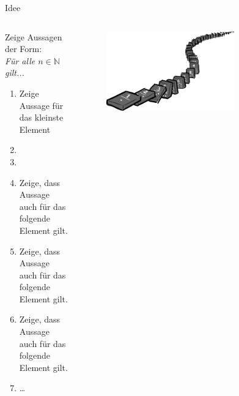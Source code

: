 \begin{frame}[fragile]{Idee}
\begin{columns}
    \begin{alertblock}{Zeige Aussagen der Form:\\\emph{Für alle $n\in\mathbb{N}$ gilt...}}
    \begin{enumerate}
        \item Zeige Aussage für das kleinste Element
        \item<1-> 
        \item<2-6,8> 
        \item<3-6> \footnotesize Zeige, dass Aussage auch für das folgende Element gilt.
        \item<4-6> \scriptsize Zeige, dass Aussage auch für das folgende Element gilt.
        \item<5-6> \tiny Zeige, dass Aussage auch für das folgende Element gilt.
        \item<6> \dots
    \end{enumerate}
    \end{alertblock}
    \begin{figure}
        \centering
        \includegraphics[width=0.7\textwidth]{../figures/induction.png}
    \end{figure}
\end{columns}
\end{frame}

